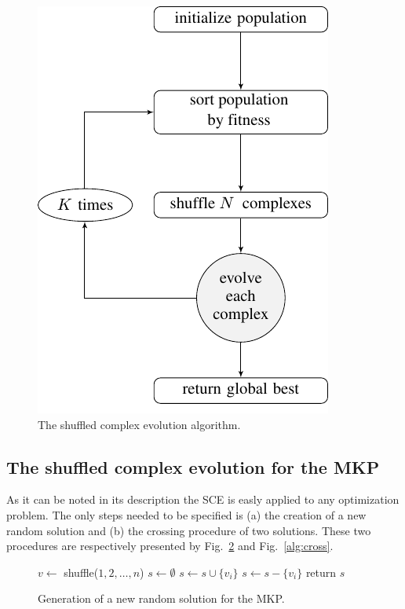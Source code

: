 \documentclass[10pt,conference, compsocconf]{IEEEtran}
\begin{document}
\begin{figure}
  \includegraphics{imgs/flow1}
  \caption{The shuffled complex evolution algorithm.}
  \label{fig:flow1}
\end{figure}


\subsection{The shuffled complex evolution for the MKP}

As it can be noted in its description the SCE is easly applied to any
optimization problem.
The only steps needed to be specified is (a) the creation of a new random
solution and (b) the crossing procedure of two solutions.
These two procedures are respectively presented by Fig.~\ref{alg:new} and
Fig.~\ref{alg:cross}.

\begin{figure}
\begin{algorithmic}[1]
    \State $v \leftarrow $ shuffle($1, 2, \ldots, n$)
	\State $s \leftarrow \emptyset$ 
	  \State $s \leftarrow s \cup \{v_i\}$ 
	   
	    \State $s \leftarrow s - \{v_i\}$
      \EndIf
	\EndFor
  \State return $s$
  \EndProcedure
\end{algorithmic}
\caption{Generation of a new random solution for the MKP.}
\label{alg:new}
\end{figure}
\end{document}
